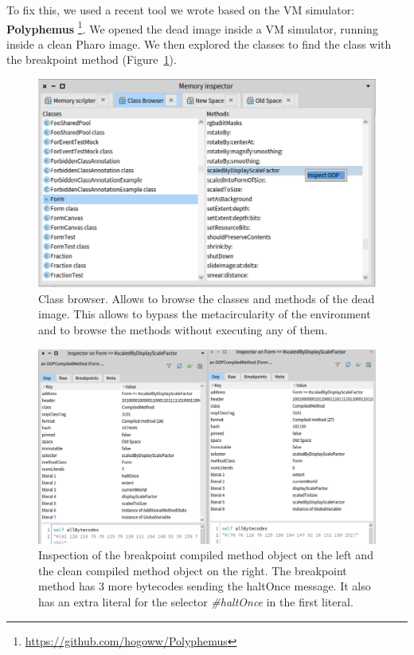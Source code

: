 \documentclass{article}
\begin{document}
To fix this, we used a recent tool we wrote based on the VM simulator: \textbf{Polyphemus} \footnote{\url{https://github.com/hogoww/Polyphemus}}.
We opened the dead image inside a VM simulator, running inside a clean Pharo image.
We then explored the classes to find the class with the breakpoint method (Figure~\ref{fig:classBrowser}).

\begin{figure}[ht]
    \centering
    \includegraphics[width=0.9\linewidth]{classBrowser}
    \caption{Class browser.
    Allows to browse the classes and methods of the dead image.
    This allows to bypass the metacircularity of the environment and to browse the methods without executing any of them.
    }%
    \label{fig:classBrowser}
\end{figure}


\begin{figure}[ht]
    \centering
    \includegraphics[width=0.9\linewidth]{methods}
    \caption{
    Inspection of the breakpoint compiled method object on the left and the clean compiled method object on the right.
    The breakpoint method has 3 more bytecodes sending the haltOnce message.
    It also has an extra literal for the selector \textit{\#haltOnce} in the first literal.
    }%
    \label{fig:methodObject}
\end{figure}
\end{document}
